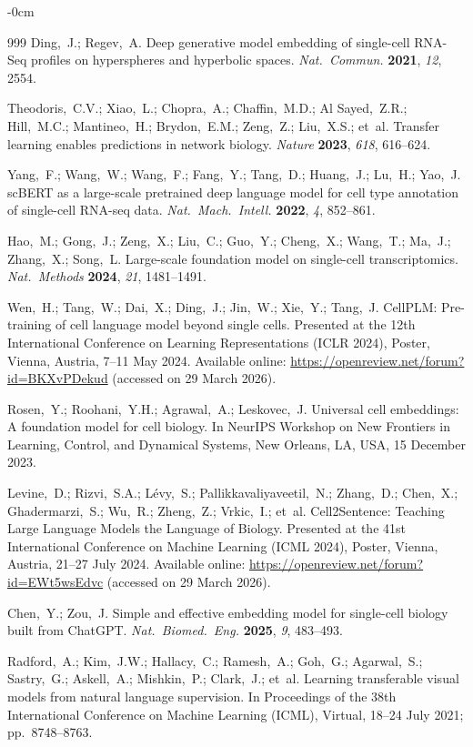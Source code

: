 \documentclass[genes,article,submit,pdftex,oneauthor]{Definitions/mdpi}
\begin{document}
\begin{adjustwidth}{-\extralength}{0cm}
\begin{thebibliography}{999}
Ding,~J.; Regev,~A. Deep generative model embedding of single-cell RNA-Seq profiles on hyperspheres and hyperbolic spaces. {\em Nat.\ Commun.} {\bf 2021}, {\em 12}, 2554.

Theodoris,~C.V.; Xiao,~L.; Chopra,~A.; Chaffin,~M.D.; Al Sayed,~Z.R.; Hill,~M.C.; Mantineo,~H.; Brydon,~E.M.; Zeng,~Z.; Liu,~X.S.; et~al. Transfer learning enables predictions in network biology. {\em Nature} {\bf 2023}, {\em 618}, 616--624.

Yang,~F.; Wang,~W.; Wang,~F.; Fang,~Y.; Tang,~D.; Huang,~J.; Lu,~H.; Yao,~J. scBERT as a large-scale pretrained deep language model for cell type annotation of single-cell RNA-seq data. {\em Nat.\ Mach.\ Intell.} {\bf 2022}, {\em 4}, 852--861.

Hao,~M.; Gong,~J.; Zeng,~X.; Liu,~C.; Guo,~Y.; Cheng,~X.; Wang,~T.; Ma,~J.; Zhang,~X.; Song,~L. Large-scale foundation model on single-cell transcriptomics. {\em Nat.\ Methods} {\bf 2024}, {\em 21}, 1481--1491.

Wen,~H.; Tang,~W.; Dai,~X.; Ding,~J.; Jin,~W.; Xie,~Y.; Tang,~J. CellPLM: Pre-training of cell language model beyond single cells. Presented at the 12th International Conference on Learning Representations (ICLR 2024), Poster, Vienna, Austria, 7--11 May 2024. Available online: \url{https://openreview.net/forum?id=BKXvPDekud} (accessed on 29 March 2026).

Rosen,~Y.; Roohani,~Y.H.; Agrawal,~A.; Leskovec,~J. Universal cell embeddings: A foundation model for cell biology. In NeurIPS Workshop on New Frontiers in Learning, Control, and Dynamical Systems, New Orleans, LA, USA, 15 December 2023.

Levine,~D.; Rizvi,~S.A.; L\'{e}vy,~S.; Pallikkavaliyaveetil,~N.; Zhang,~D.; Chen,~X.; Ghadermarzi,~S.; Wu,~R.; Zheng,~Z.; Vrkic,~I.; et~al. Cell2Sentence: Teaching Large Language Models the Language of Biology. Presented at the 41st International Conference on Machine Learning (ICML 2024), Poster, Vienna, Austria, 21--27 July 2024. Available online: \url{https://openreview.net/forum?id=EWt5wsEdvc} (accessed on 29 March 2026).

Chen,~Y.; Zou,~J. Simple and effective embedding model for single-cell biology built from ChatGPT. {\em Nat.\ Biomed.\ Eng.} {\bf 2025}, {\em 9}, 483--493.

Radford,~A.; Kim,~J.W.; Hallacy,~C.; Ramesh,~A.; Goh,~G.; Agarwal,~S.; Sastry,~G.; Askell,~A.; Mishkin,~P.; Clark,~J.; et~al. Learning transferable visual models from natural language supervision. In Proceedings of the 38th International Conference on Machine Learning (ICML), Virtual, 18--24 July 2021; pp.\ 8748--8763.


\end{thebibliography}
\end{adjustwidth}
\end{document}

